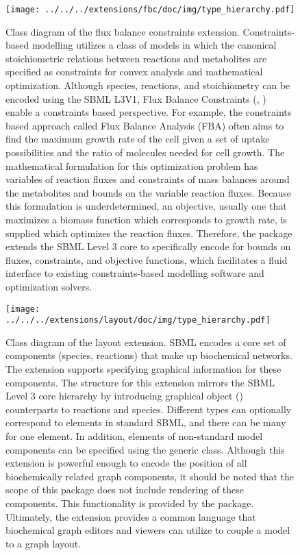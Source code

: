 \begin{figure}[hb]
 \centering
 \vspace*{2ex}
 \texttt{[image: ../../../extensions/fbc/doc/img/type\_hierarchy.pdf]}
 \caption[Class diagram of the flux balance constraints extension.]{Class diagram of the flux balance constraints extension. Constraints-based modelling \cite{lewis2012} utilizes a class of models in which
the canonical stoichiometric relations between reactions and metabolites are specified
as constraints for convex analysis and mathematical optimization. Although species,
reactions, and stoichiometry can be encoded using the SBML L3V1,
Flux Balance Constraints (, \cite{olivier2013}) enable a constraints
based perspective. For example, the constraints based approach called
Flux Balance Analysis (FBA) often aims to find the maximum growth rate of the
cell given a set of uptake possibilities and the ratio of molecules needed
for cell growth. The mathematical formulation for this optimization problem
has variables of reaction fluxes and constraints of mass balances around the
metabolites and bounds on the variable reaction fluxes. Because this formulation is
underdetermined, an objective, usually one that maximizes a biomass function which
corresponds to growth rate, is supplied which optimizes the reaction fluxes. Therefore,
the  package extends the SBML Level 3 core to specifically encode for bounds on
fluxes, constraints, and objective functions, which facilitates a fluid interface to
existing constraints-based modelling software and optimization solvers.}
 \label{fig:fbc}
\end{figure}

\begin{figure}[hb]
 \centering
 \vspace*{2ex}
 \texttt{[image: ../../../extensions/layout/doc/img/type\_hierarchy.pdf]}
 \caption[Class diagram of the layout extension]{Class diagram of the layout extension. SBML encodes a core set of components (species, reactions) that make up
biochemical networks. The  extension supports specifying graphical
information for these components. The structure for this extension mirrors 
the SBML Level 3 core hierarchy by introducing graphical object ()
counterparts to reactions and species. Different  types can optionally correspond
to elements in standard SBML, and there can be many  for one element.
In addition,  elements of non-standard model components can be specified
using the generic  class. Although this extension is powerful
enough to encode the position of all biochemically related graph components,
it should be noted that the scope of this package does not include rendering
of these components. This functionality is provided by the  package.
Ultimately, the  extension provides a common language that biochemical
graph editors and viewers can utilize to couple a model to a graph layout.}
 \label{fig:layout}
\end{figure}

